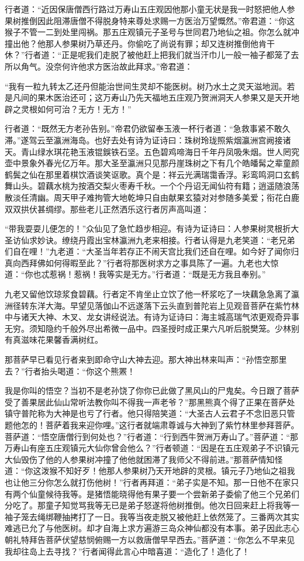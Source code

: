 \documentclass[12pt,UTF8]{ctexbook}
\begin{document}
行者道：“近因保唐僧西行路过万寿山五庄观因他那小童无状是我一时怒把他人参果树推倒因此阻滞唐僧不得脱身特来尊处求赐一方医治万望慨然。”帝君道：“你这猴子不管一二到处里闯祸。那五庄观镇元子圣号与世同君乃地仙之祖。你怎么就冲撞出他？他那人参果树乃草还丹。你偷吃了尚说有罪；却又连树推倒他肯干休？”行者道：“正是呢我们走脱了被他赶上把我们就当汗巾儿一般一袖子都笼了去所以角气。没奈何许他求方医治故此拜求。”帝君道：

“我有一粒九转太乙还丹但能治世间生灵却不能医树。树乃水土之灵天滋地润。若是凡间的果木医治还可；这万寿山乃先天福地五庄观乃贺洲洞天人参果又是天开地辟之灵根如何可治？无方！无方！”

行者道：“既然无方老孙告别。”帝君仍欲留奉玉液一杯行者道：“急救事紧不敢久滞。”遂驾云至瀛洲海岛。也好去处有诗为证诗曰：珠树玲珑照紫烟瀛洲宫阙接诸天。青山绿水琪花艳玉液锟鋘铁石坚。五色碧鸡啼海日千年丹凤吸朱烟。世人罔究壶中景象外春光亿万年。那大圣至瀛洲只见那丹崖珠树之下有几个皓皤髯之辈童颜鹤鬓之仙在那里着棋饮酒谈笑讴歌。真个是：祥云光满瑞霭香浮。彩鸾鸣洞口玄鹤舞山头。碧藕水桃为按酒交梨火枣寿千秋。一个个丹诏无闻仙符有籍；逍遥随浪荡散淡任清幽。周天甲子难拘管大地乾坤只自由献果玄猿对对参随多美爱；衔花白鹿双双拱伏甚绸缪。那些老儿正然洒乐这行者厉声高叫道：

“带我耍耍儿便怎的！”众仙见了急忙趋步相迎。有诗为证诗曰：人参果树灵根折大圣访仙求妙诀。缭绕丹霞出宝林瀛洲九老来相接。行者认得是九老笑道：“老兄弟们自在哩！”九老道：“大圣当年若存正不闹天宫比我们还自在哩。如今好了闻你归真向西拜佛如何得暇至此？”行者将那医树求方之事具陈了一遍。九老也大惊道：“你也忒惹祸！惹祸！我等实是无方。”行者道：“既是无方我且奉别。”

九老又留他饮琼浆食碧藕。行者定不肯坐止立饮了他一杯浆吃了一块藕急急离了瀛洲径转东洋大海。早望见落伽山不远遂落下云头直到普陀岩上见观音菩萨在紫竹林中与诸天大神、木叉、龙女讲经说法。有诗为证诗曰：海主城高瑞气浓更观奇异事无穷。须知隐约千般外尽出希微一品中。四圣授时成正果六凡听后脱樊笼。少林别有真滋味花果馨香满树红。

那菩萨早已看见行者来到即命守山大神去迎。那大神出林来叫声：“孙悟空那里去？”行者抬头喝道：“你这个熊罴！

我是你叫的悟空？当初不是老孙饶了你你已此做了黑风山的尸鬼矣。今日跟了菩萨受了善果居此仙山常听法教你叫不得我一声老爷？”那黑熊真个得了正果在菩萨处镇守普陀称为大神是也亏了行者。他只得陪笑道：“大圣古人云君子不念旧恶只管题他怎的！菩萨着我来迎你哩。”这行者就端肃尊诚与大神到了紫竹林里参拜菩萨。菩萨道：“悟空唐僧行到何处也？”行者道：“行到西牛贺洲万寿山了。”菩萨道：“那万寿山有座五庄观镇元大仙你曾会他么？”行者顿道：“因是在五庄观弟子不识镇元大仙毁伤了他的人参果树冲撞了他他就困滞了我师父不得前进。”那菩萨情知怪道：“你这泼猴不知好歹！他那人参果树乃天开地辟的灵根。镇元子乃地仙之祖我也让他三分你怎么就打伤他树！”行者再拜道：“弟子实是不知。那一日他不在家只有两个仙童候待我等。是猪悟能晓得他有果子要一个尝新弟子委偷了他三个兄弟们分吃了。那童子知觉骂我等无已是弟子怒遂将他树推倒。他次日回来赶上将我等一袖子笼去绳绑鞭抽拷打了一日。我等当夜走脱又被他赶上依然笼了。三番两次其实难逃已允了与他医树。却才自海上求方遍游三岛众神仙都没有本事。弟子因此志心朝礼特拜告菩萨伏望慈悯俯赐一方以救唐僧早早西去。”菩萨道：“你怎么不早来见我却往岛上去寻找？”行者闻得此言心中暗喜道：“造化了！造化了！
\end{document}
